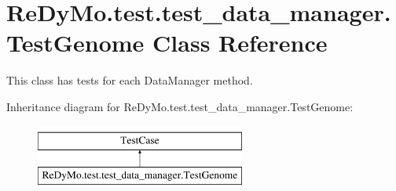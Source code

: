 \hypertarget{classReDyMo_1_1test_1_1test__data__manager_1_1TestGenome}{}\section{Re\+Dy\+Mo.\+test.\+test\+\_\+data\+\_\+manager.\+Test\+Genome Class Reference}
\label{classReDyMo_1_1test_1_1test__data__manager_1_1TestGenome}


This class has tests for each Data\+Manager method.  


Inheritance diagram for Re\+Dy\+Mo.\+test.\+test\+\_\+data\+\_\+manager.\+Test\+Genome\+:\begin{figure}[H]
\begin{center}
\leavevmode
\includegraphics[height=2.000000cm]{classReDyMo_1_1test_1_1test__data__manager_1_1TestGenome}
\end{center}
\end{figure}
